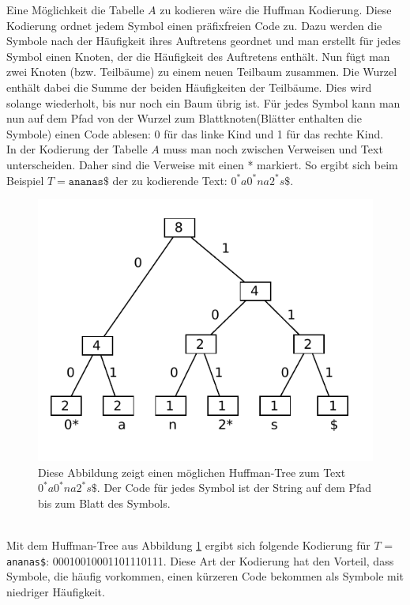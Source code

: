 \documentclass[a4paper,11pt]{scrartcl}%
\theoremstyle{nonumberplain}
\theoremstyle{change}
\theoremstyle{nonumberplain}
\theoremstyle{change}
\theoremstyle{nonumberplain}
\begin{document}
	Eine Möglichkeit die Tabelle $A$ zu kodieren wäre die Huffman Kodierung. Diese Kodierung ordnet jedem Symbol einen präfixfreien Code zu. Dazu werden die Symbole nach der Häufigkeit ihres Auftretens geordnet und man erstellt für jedes Symbol einen Knoten, der die Häufigkeit des Auftretens enthält. Nun fügt man zwei Knoten (bzw. Teilbäume) zu einem neuen Teilbaum zusammen. Die Wurzel enthält dabei die Summe der beiden Häufigkeiten der Teilbäume. Dies wird solange wiederholt, bis nur noch ein Baum übrig ist. Für jedes Symbol kann man nun auf dem Pfad von der Wurzel zum Blattknoten(Blätter enthalten die Symbole) einen Code ablesen: 0 für das linke Kind und 1 für das rechte Kind. \\
	In der Kodierung der Tabelle $A$ muss man noch zwischen Verweisen und Text unterscheiden. Daher sind die Verweise mit einen * markiert. So ergibt sich beim Beispiel $T = \texttt{ananas\$}$ der zu kodierende Text: \texttt{$0^*a0^*na2^*s\$$}.
	\begin{figure}[h]
			\centering
			\includegraphics[scale=0.8]{huffmanTree}
			\caption{Diese Abbildung zeigt einen möglichen Huffman-Tree zum Text \texttt{$0^*a0^*na2^*s\$$}. Der Code für jedes Symbol ist der String auf dem Pfad bis zum Blatt des Symbols.}
			\label{fig:huffman}
	\end{figure}
	\\Mit dem Huffman-Tree aus Abbildung \ref{fig:huffman}  ergibt sich folgende Kodierung für $T$ = \texttt{ananas\$}:
	00010010001101110111.
	Diese Art der Kodierung hat den Vorteil, dass Symbole, die häufig vorkommen, einen kürzeren Code bekommen als Symbole mit niedriger Häufigkeit.
	
\end{document}
